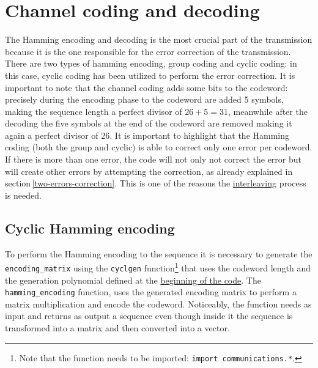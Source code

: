 \vspace{40px} \section{Channel coding and decoding}
The Hamming encoding and decoding is the most crucial part of the transmission because it is the one responsible for the error correction of the transmission. There are two types of hamming encoding, group coding and cyclic coding: in this case, cyclic coding has been utilized to perform the error correction. It is important to note that the channel coding adds some bits to the codeword: precisely during the encoding phase to the codeword are added 5 symbols, making the sequence length a perfect divisor of $26 + 5 = 31$, meanwhile after the decoding the five symbols at the end of the codeword are removed making it again a perfect divisor of 26. It is important to highlight that the Hamming coding (both the group and cyclic) is able to correct only one error per codeword. If there is more than one error, the code will not only not correct the error but will create other errors by attempting the correction, as already explained in section\,\ref{two-errors-correction}. This is one of the reasons the \hyperref[interleaving-process]{interleaving} process is needed.





\subsection{Cyclic Hamming encoding}\label{hamming-encoding}
To perform the Hamming encoding to the sequence it is necessary to generate the \texttt{encoding\_matrix} using the \texttt{cyclgen} function\footnote{Note that the function needs to be imported: \texttt{import communications.*}.} that uses the codeword length and the generation polynomial defined at the \hyperref[initial-parameters]{beginning of the code}. The \texttt{hamming\_encoding} function, uses the generated encoding matrix to perform a matrix multiplication and encode the codeword. Noticeably, the function needs as input and returns as output a sequence even though inside it the sequence is transformed into a matrix and then converted into a vector.

